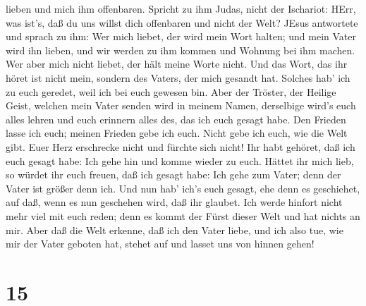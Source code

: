 lieben und mich ihm offenbaren.  Spricht zu ihm Judas,
nicht der Ischariot: HErr, was ist's, daß du uns willst dich offenbaren
und nicht der Welt?  JEsus antwortete und sprach zu ihm:
Wer mich liebet, der wird mein Wort halten; und mein Vater wird ihn
lieben, und wir werden zu ihm kommen und Wohnung bei ihm machen.
 Wer aber mich nicht liebet, der hält meine Worte nicht.
Und das Wort, das ihr höret ist nicht mein, sondern des Vaters, der mich
gesandt hat.  Solches hab' ich zu euch geredet, weil ich
bei euch gewesen bin.  Aber der Tröster, der Heilige Geist,
welchen mein Vater senden wird in meinem Namen, derselbige wird's euch
alles lehren und euch erinnern alles des, das ich euch gesagt habe.
 Den Frieden lasse ich euch; meinen Frieden gebe ich euch.
Nicht gebe ich euch, wie die Welt gibt. Euer Herz erschrecke nicht und
fürchte sich nicht!  Ihr habt gehöret, daß ich euch gesagt
habe: Ich gehe hin und komme wieder zu euch. Hättet ihr mich lieb, so
würdet ihr euch freuen, daß ich gesagt habe: Ich gehe zum Vater; denn
der Vater ist größer denn ich.  Und nun hab' ich's euch
gesagt, ehe denn es geschiehet, auf daß, wenn es nun geschehen wird, daß
ihr glaubet.  Ich werde hinfort nicht mehr viel mit euch
reden; denn es kommt der Fürst dieser Welt und hat nichts an mir.
 Aber daß die Welt erkenne, daß ich den Vater liebe, und
ich also tue, wie mir der Vater geboten hat, stehet auf und lasset uns
von hinnen gehen!

\hypertarget{section-14}{%
\section{15}\label{section-14}}

